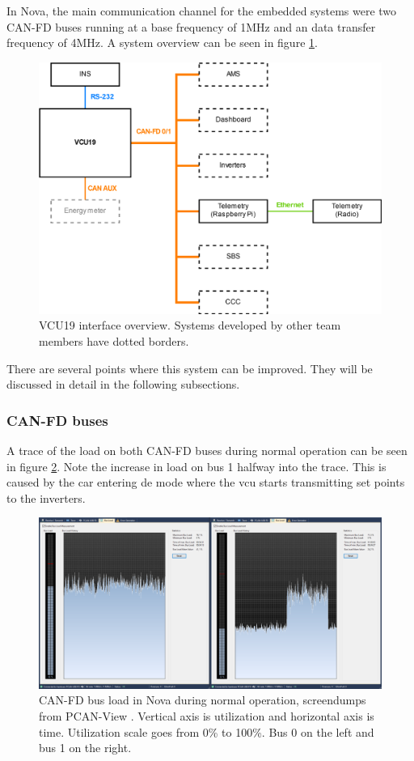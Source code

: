 In Nova, the main communication channel for the embedded systems were two CAN-FD buses running at a base frequency of 1MHz and an data transfer frequency of 4MHz. A system overview can be seen in figure \ref{fig:vcu19_system}.

\begin{figure}[H]
    \centering
    \includegraphics[width=.85\textwidth]{media/vcu19_system.png}
    \caption{VCU19 interface overview. Systems developed by other team members have dotted borders.}
    \label{fig:vcu19_system}
\end{figure}

There are several points where this system can be improved. They will be discussed in detail in the following subsections.


\subsubsection{CAN-FD buses}

A trace of the load on both CAN-FD buses during normal operation can be seen in figure \ref{fig:canfd_load}. Note the increase in load on bus 1 halfway into the trace. This is caused by the car entering \acrfull{de} mode where the \acrshort{vcu} starts transmitting set points to the inverters. 

\begin{figure}[H]
    \centering
    \includegraphics[width=\textwidth]{media/canfd-load.png}
    \caption{CAN-FD bus load in Nova during normal operation, screendumps from PCAN-View \cite{pcanview}. Vertical axis is utilization and horizontal axis is time. Utilization scale goes from 0\% to 100\%. Bus 0 on the left and bus 1 on the right.}
    \label{fig:canfd_load}
\end{figure}

